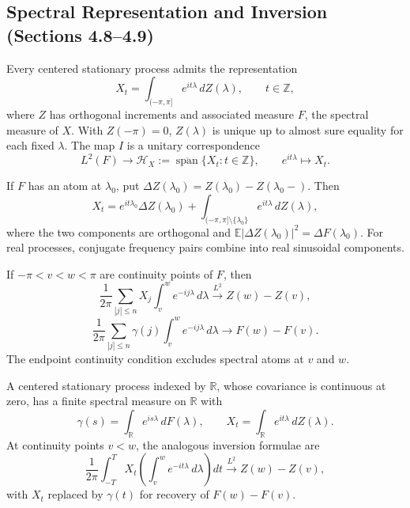 \subsection{Spectral Representation and Inversion (Sections 4.8--4.9)}
\begin{theorem}
Every centered stationary process admits the representation
\[
X_t=\int_{(-\pi,\pi]}e^{it\lambda}\,dZ(\lambda),\qquad t\in\mathbb Z,
\]
where $Z$ has orthogonal increments and associated measure $F$, the spectral
measure of $X$. With $Z(-\pi)=0$, $Z(\lambda)$ is unique up to almost sure
equality for each fixed $\lambda$.
The map $I$ is a unitary correspondence
\[
L^2(F)\longrightarrow
\mathcal H_X:=\overline{\operatorname{span}}\{X_t:t\in\mathbb Z\},
\qquad e^{it\lambda}\longmapsto X_t.
\]
\end{theorem}
\begin{proposition}
If $F$ has an atom at $\lambda_0$, put
$\Delta Z(\lambda_0)=Z(\lambda_0)-Z(\lambda_0-)$.
Then
\[
X_t=e^{it\lambda_0}\Delta Z(\lambda_0)
+\int_{(-\pi,\pi]\setminus\{\lambda_0\}}e^{it\lambda}\,dZ(\lambda),
\]
where the two components are orthogonal and
$\mathbb E|\Delta Z(\lambda_0)|^2=\Delta F(\lambda_0)$.
For real processes, conjugate frequency pairs combine into real sinusoidal
components.
\end{proposition}
\begin{theorem}
If $-\pi<v<w<\pi$ are continuity points of $F$, then
\[
\frac1{2\pi}\sum_{|j|\le n}X_j\int_v^w e^{-ij\lambda}\,d\lambda
\xrightarrow{L^2}Z(w)-Z(v),
\]
\[
\frac1{2\pi}\sum_{|j|\le n}\gamma(j)\int_v^w e^{-ij\lambda}\,d\lambda
\longrightarrow F(w)-F(v).
\]
The endpoint continuity condition excludes spectral atoms at $v$ and $w$.
\end{theorem}
\begin{theorem}
A centered stationary process indexed by $\mathbb R$, whose covariance is
continuous at zero, has a finite spectral measure on $\mathbb R$ with
\[
\gamma(s)=\int_{\mathbb R}e^{is\lambda}\,dF(\lambda),\qquad
X_t=\int_{\mathbb R}e^{it\lambda}\,dZ(\lambda).
\]
At continuity points $v<w$, the analogous inversion formulae are
\[
\frac1{2\pi}\int_{-T}^T X_t\left(\int_v^w e^{-it\lambda}\,d\lambda\right)dt
\xrightarrow{L^2}Z(w)-Z(v),
\]
with $X_t$ replaced by $\gamma(t)$ for recovery of $F(w)-F(v)$.
\end{theorem}

